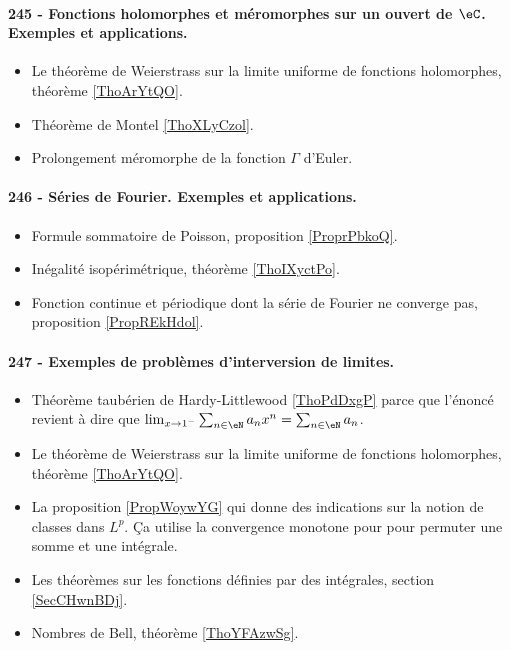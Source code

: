 \paragraph{245 - Fonctions holomorphes et méromorphes sur un ouvert de \( \eC\). Exemples et applications.}
\begin{itemize}
    \item Le théorème de Weierstrass sur la limite uniforme de fonctions holomorphes, théorème \ref{ThoArYtQO}.
    \item Théorème de Montel \ref{ThoXLyCzol}.
    \item Prolongement méromorphe de la fonction \( \Gamma\) d'Euler.
\end{itemize}
\paragraph{246 - Séries de Fourier. Exemples et applications.}
\begin{itemize}
    \item Formule sommatoire de Poisson, proposition \ref{ProprPbkoQ}.
    \item Inégalité isopérimétrique, théorème \ref{ThoIXyctPo}.
    \item Fonction continue et périodique dont la série de Fourier ne converge pas, proposition \ref{PropREkHdol}.
\end{itemize}
\paragraph{247 - Exemples de problèmes d’interversion de limites.}
\begin{itemize}
    \item Théorème taubérien de Hardy-Littlewood \ref{ThoPdDxgP} parce que l'énoncé revient à dire que \( \lim_{x\to 1^-} \sum_{n\in \eN}a_nx^n=\sum_{n\in \eN}a_n\).
    \item Le théorème de Weierstrass sur la limite uniforme de fonctions holomorphes, théorème \ref{ThoArYtQO}.
    \item La proposition \ref{PropWoywYG} qui donne des indications sur la notion de classes dans \( L^p\). Ça utilise la convergence monotone pour  pour permuter une somme et une intégrale.
    \item Les théorèmes sur les fonctions définies par des intégrales, section \ref{SecCHwnBDj}.
    \item Nombres de Bell, théorème \ref{ThoYFAzwSg}.
\end{itemize}
